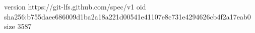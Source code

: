 version https://git-lfs.github.com/spec/v1
oid sha256:b755daee686009d1ba2a18a221d00541e41107e8c731e4294626cb4f2a17eab0
size 3587
